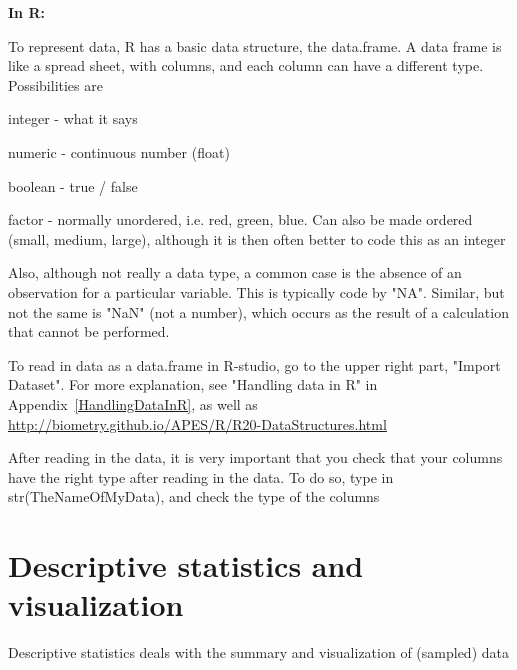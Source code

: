 \documentclass[a4paper,twoside]{tufte-book}\usepackage[]{graphicx}\usepackage[]{color}
\begin{document}
\vspace{1cm}
\begin{fullwidth}
\begin{mdframed}
    
\textbf{In R:} 

To represent data, R has a basic data structure, the data.frame. A data frame is like a spread sheet, with columns, and each column can have a different type. Possibilities are

\begin{itemize*}
  \item integer - what it says
  \item numeric - continuous number (float)
  \item boolean - true / false
  \item factor - normally unordered, i.e. red, green, blue. Can also be made ordered (small, medium, large), although it is then often better to code this as an integer
\end{itemize*}

Also, although not really a data type, a common case is the absence of an observation for a particular variable. This is typically code by "NA". Similar, but not the same is "NaN" (not a number), which occurs as the result of a calculation that cannot be performed. 

To read in data as a data.frame in R-studio, go to the upper right part, "Import Dataset". For more explanation, see "Handling data in R" in Appendix~\ref{HandlingDataInR}, as well as \href{http://biometry.github.io/APES/R/R20-DataStructures.html}{http://biometry.github.io/APES/R/R20-DataStructures.html}

After reading in the data, it is very important that you check that your columns have the right type after reading in the data. To do so, type in str(TheNameOfMyData), and check the type of the columns

\end{mdframed}
\end{fullwidth}


\chapter{Descriptive statistics and visualization}

Descriptive statistics deals with the summary and visualization of (sampled) data
\end{document}

